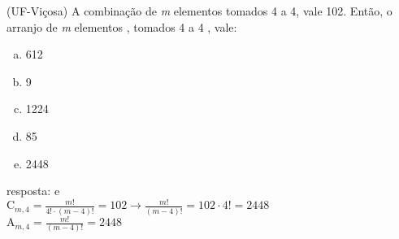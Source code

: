 \begin{ex}
(UF-Viçosa) A combinação de \textit{m} elementos tomados 4 a 4, vale 102. Então, o arranjo de \textit{m} elementos , tomados 4 a 4 , vale:
   \begin{enumerate}[(a)]
   \item 612
   \item 9
   \item 1224
   \item 85
   \item 2448
   \end{enumerate}
     \begin{sol}
       resposta: e \\
       $\mathrm{C}_{m,4}=\frac{m!}{4!\cdot(m-4)!}=102 \longrightarrow \frac{m!}{(m-4)!}=102\cdot4!=2448$\\ $\mathrm{A}_{m,4}=\frac{m!}{(m-4)!}=2448$
       
     \end{sol} 
\end{ex}